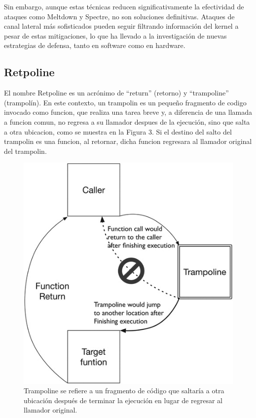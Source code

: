 \documentclass[lettersize,compsoc]{IEEEtran}
\begin{document}
\noindent Sin embargo, aunque estas técnicas reducen significativamente la efectividad de ataques como Meltdown y Spectre, no son soluciones definitivas. Ataques de canal lateral más sofisticados pueden seguir filtrando información del kernel a pesar de estas mitigaciones, lo que ha llevado a la investigación de nuevas estrategias de defensa, tanto en software como en hardware.

\subsection{Retpoline}
El nombre Retpoline es un acrónimo de “return” (retorno) y “trampoline” (trampolín). En este contexto, un trampolin es un pequeño fragmento de codigo invocado como funcion, que realiza una tarea breve y, a diferencia de una llamada a funcion comun, no regresa a su llamador despues de la ejecución, sino que salta a otra ubicacion, como se muestra en la Figura 3. Si el destino del salto del trampolin es una funcion, al retornar, dicha funcion regresara al llamador original del trampolin.
\begin{figure}[h]
  \centering
  \includegraphics[width=\linewidth]{retpoline.jpg}
  \caption{\small Trampoline se refiere a un fragmento de código que saltaría a otra ubicación después de terminar la ejecución en lugar de regresar al llamador original.}
\end{figure}
\end{document}
